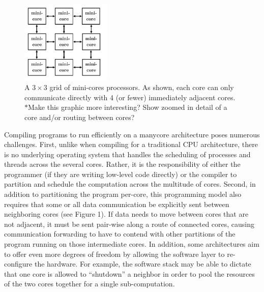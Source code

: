 \documentclass{sig-alternate-05-2015}
\newcommand{\note}{\color{red}$*$}
\begin{document}
\begin{figure}
\centering
\includegraphics[width=1.7in]{core-grid.png}
\caption{A $3 \times 3$ grid of mini-cores processors. As shown, each core can only communicate directly with 4 (or fewer) immediately adjacent cores. {\note Make this graphic more interesting? Show zoomed in detail of a core and/or routing between cores?}}
\end{figure}

Compiling programs to run efficiently on a manycore architecture poses numerous challenges. First, unlike when compiling for a traditional CPU architecture, there is no underlying operating system that handles the scheduling of processes and threads across the several cores. Rather, it is the responsibility of either the programmer (if they are writing low-level code directly) or the compiler to partition and schedule the computation across the multitude of cores. Second, in addition to partitioning the program per-core, this programming model also requires that some or all data communication be explicitly sent between neighboring cores (see Figure 1). If data needs to move between cores that are not adjacent, it must be sent pair-wise along a route of connected cores, causing communication forwarding to have to contend with other partitions of the program running on those intermediate cores. In addition, some architectures aim to offer even more degrees of freedom by allowing the software layer to re-configure the hardware. For example, the software stack may be able to dictate that one core is allowed to ``shutdown'' a neighbor in order to pool the resources of the two cores together for a single sub-computation. 
\end{document}
